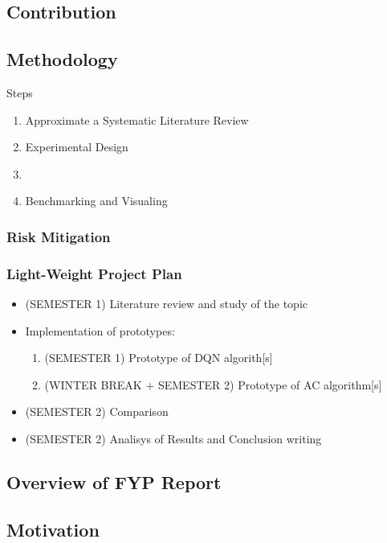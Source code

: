 \subsection{Contribution}

\subsection{Methodology}

Steps
\begin{enumerate}
    \item Approximate a Systematic Literature Review
    \item Experimental Design
    \item 
    \item Benchmarking and Visualing
\end{enumerate}

\subsubsection{Risk Mitigation}

\subsubsection{Light-Weight Project Plan}

\begin{itemize}
    \item (SEMESTER 1) Literature review and study of the topic
    \item Implementation of prototypes:
        \begin{enumerate}
            \item (SEMESTER 1) Prototype of DQN algorith[s]
            \item (WINTER BREAK + SEMESTER 2) Prototype of AC algorithm[s]
        \end{enumerate}
    \item (SEMESTER 2) Comparison
    \item (SEMESTER 2) Analisys of Results and Conclusion writing
\end{itemize}

\subsection{Overview of FYP Report}

\subsection{Motivation}



